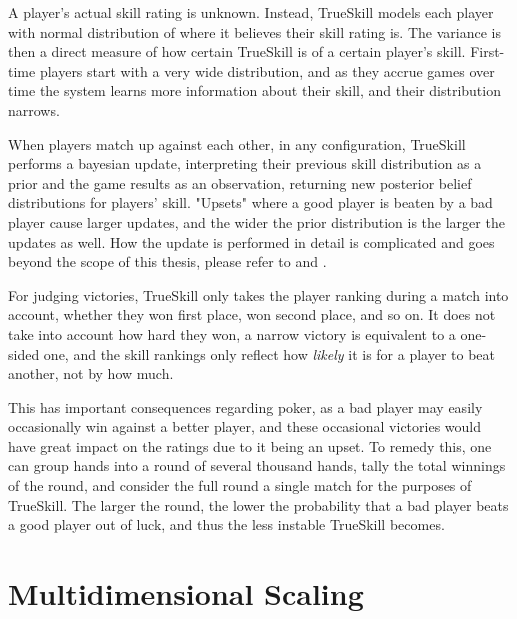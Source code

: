 A player's actual skill rating is unknown. Instead, TrueSkill models each player with normal distribution of where it believes their skill rating is. The variance is then a direct measure of how certain TrueSkill is of a certain player's skill. First-time players start with a very wide distribution, and as they accrue games over time the system learns more information about their skill, and their distribution narrows.

When players match up against each other, in any configuration, TrueSkill performs a bayesian update, interpreting their previous skill distribution as a prior and the game results as an observation, returning new posterior belief distributions for players' skill. "Upsets" where a good player is beaten by a bad player cause larger updates, and the wider the prior distribution is the larger the updates as well. How the update is performed in detail is complicated and goes beyond the scope of this thesis, please refer to \cite{TrueSkill_original} and \cite{TrueSkill_blog}.

For judging victories, TrueSkill only takes the player ranking during a match into account, whether they won first place, won second place, and so on. It does not take into account how hard they won, a narrow victory is equivalent to a one-sided one, and the skill rankings only reflect how \textit{likely} it is for a player to beat another, not by how much.

This has important consequences regarding poker, as a bad player may easily occasionally win against a better player, and these occasional victories would have great impact on the ratings due to it being an upset. To remedy this, one can group hands into a round of several thousand hands, tally the total winnings of the round, and consider the full round a single match for the purposes of TrueSkill. The larger the round, the lower the probability that a bad player beats a good player out of luck, and thus the less instable TrueSkill becomes.

\section{Multidimensional Scaling}